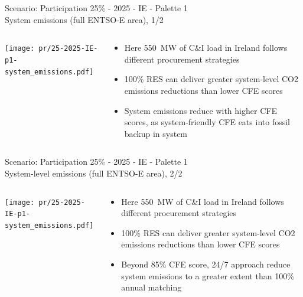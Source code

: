 \begin{frame}{Scenario: Participation 25\% - 2025 - IE - Palette 1 \\
System emissions (full ENTSO-E area),  1/2}

\begin{columns}[T]
\begin{column}{9cm}
\centering

\texttt{[image: pr/25-2025-IE-p1-system\_emissions.pdf]}
\end{column}
\begin{column}{5cm}

  \begin{itemize}
   \item  Here 550~MW of C\&I load in Ireland follows different procurement strategies
   \item 100\% RES can deliver greater system-level CO2 emissions reductions than lower CFE scores
   \item \alert{System emissions reduce} with higher CFE scores, as system-friendly CFE eats into fossil backup in system

  \end{itemize}
\end{column}
\end{columns}

\end{frame}


\begin{frame}{Scenario: Participation 25\% - 2025 - IE - Palette 1 \\
System-level emissions (full ENTSO-E area), 2/2}

\begin{columns}[T]
\begin{column}{9cm}
\centering

\texttt{[image: pr/25-2025-IE-p1-system\_emissions.pdf]}
\end{column}
\begin{column}{5cm}

  \begin{itemize}
   \item  Here 550~MW of C\&I load in Ireland follows different procurement strategies
   \item 100\% RES can deliver greater system-level CO2 emissions reductions than lower CFE scores
   \item \alert{Beyond 85\% CFE score}, 24/7 approach reduce system emissions to a greater extent than 100\% annual matching

  \end{itemize}
\end{column}
\end{columns}

\end{frame}

